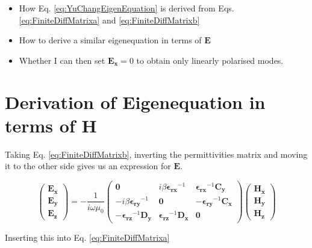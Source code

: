 \documentclass[]{article}
\begin{document}
\begin{itemize}
	\item How Eq. \ref{eq:YuChangEigenEquation} is derived from Eqs. \ref{eq:FiniteDiffMatrixa} and \ref{eq:FiniteDiffMatrixb}
	\item How to derive a similar eigenequation in terms of $\mathbf{E}$
	\item Whether I can then set $\mathbf{E_x} = 0$ to obtain only linearly polarised modes.
\end{itemize}

\newpage

\section{Derivation of Eigenequation in terms of $\mathbf{H}$}


Taking Eq. \ref{eq:FiniteDiffMatrixb}, inverting the permittivities matrix and moving it to the other side gives us an expression for $\mathbf{E}$.

\begin{equation*}
\begin{pmatrix}
\mathbf{E_x} \\
\mathbf{E_y} \\
\mathbf{E_z}
\end{pmatrix}
=
-\frac{1}{i \omega \mu_0}
\begin{pmatrix}
\mathbf{0} & i \beta \mathbf{\epsilon_{rx}}^{-1} & \mathbf{\epsilon_{rx}}^{-1} \mathbf{C_y} \\
-i \beta \mathbf{\epsilon_{ry}}^{-1} & \mathbf{0} & - \mathbf{\epsilon_{ry}}^{-1} \mathbf{C_x} \\
-\mathbf{\epsilon_{rz}}^{-1} \mathbf{D_y} & \mathbf{\epsilon_{rz}}^{-1} \mathbf{D_x} & \mathbf{0} 
\end{pmatrix}
\begin{pmatrix}
\mathbf{H_x} \\
\mathbf{H_y} \\
\mathbf{H_z}
\end{pmatrix}
\end{equation*}

Inserting this into Eq. \ref{eq:FiniteDiffMatrixa}
\end{document}
